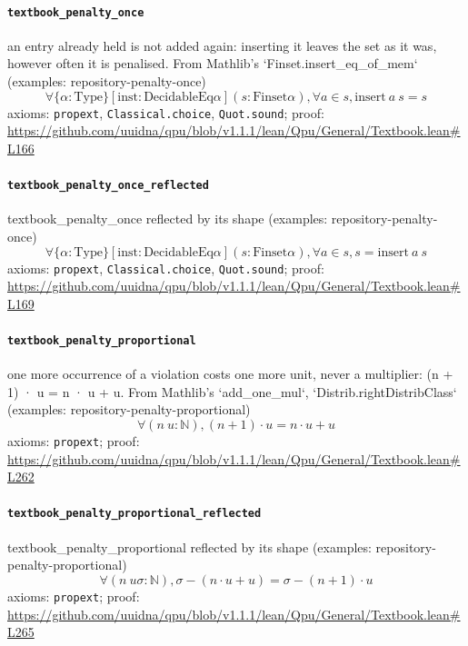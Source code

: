 \documentclass[11pt]{article}
\begin{document}
\paragraph{\texttt{textbook\_penalty\_once}}
an entry already held is not added again: inserting it leaves the set as it was, however often it is penalised. From Mathlib's `Finset.insert\_eq\_of\_mem` (examples: repository-penalty-once)
\[ \forall \{\alpha : \mathrm{Type}\} [\mathrm{inst} : \mathrm{DecidableEq} \alpha ] (s : \mathrm{Finset} \alpha ), \forall a \in s, \mathrm{insert}\ a\ s = s \]
\noindent axioms: \texttt{propext}, \texttt{Classical.choice}, \texttt{Quot.sound}; proof: \url{https://github.com/uuidna/qpu/blob/v1.1.1/lean/Qpu/General/Textbook.lean\#L166}

\paragraph{\texttt{textbook\_penalty\_once\_reflected}}
textbook\_penalty\_once reflected by its shape (examples: repository-penalty-once)
\[ \forall \{\alpha : \mathrm{Type}\} [\mathrm{inst} : \mathrm{DecidableEq} \alpha ] (s : \mathrm{Finset} \alpha ), \forall a \in s, s = \mathrm{insert}\ a\ s \]
\noindent axioms: \texttt{propext}, \texttt{Classical.choice}, \texttt{Quot.sound}; proof: \url{https://github.com/uuidna/qpu/blob/v1.1.1/lean/Qpu/General/Textbook.lean\#L169}

\paragraph{\texttt{textbook\_penalty\_proportional}}
one more occurrence of a violation costs one more unit, never a multiplier: (n + 1) · u = n · u + u. From Mathlib's `add\_one\_mul`, `Distrib.rightDistribClass` (examples: repository-penalty-proportional)
\[ \forall (n\ u : \mathbb{N}), (n + 1) \cdot u = n \cdot u + u \]
\noindent axioms: \texttt{propext}; proof: \url{https://github.com/uuidna/qpu/blob/v1.1.1/lean/Qpu/General/Textbook.lean\#L262}

\paragraph{\texttt{textbook\_penalty\_proportional\_reflected}}
textbook\_penalty\_proportional reflected by its shape (examples: repository-penalty-proportional)
\[ \forall (n\ u \sigma : \mathbb{N}), \sigma - (n \cdot u + u) = \sigma - (n + 1) \cdot u \]
\noindent axioms: \texttt{propext}; proof: \url{https://github.com/uuidna/qpu/blob/v1.1.1/lean/Qpu/General/Textbook.lean\#L265}
\end{document}
